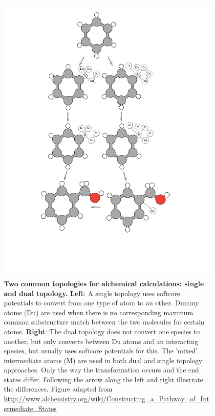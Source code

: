 \documentclass[9pt,bestpractices]{livecoms}
\begin{document}
\begin{figure}
    \includegraphics[width=0.95\columnwidth]{figures/fig3_topol/Figure.pdf}
    \caption{\textbf{Two common topologies for alchemical calculations: single and dual topology.} \textbf{Left}: A single topology uses softcore potentials to convert from one type of atom to an other. Dummy atoms (Du) are used when there is no corresponding maximum common substructure match between the two molecules for certain atoms. \textbf{Right}: The dual topology does not convert one species to another, but only converts between Du atoms and an interacting species, but usually uses softcore potentials for this. The 'mixed' intermediate atoms (M) are used in both dual and single topology approaches. Only the way the transformation occurs and the end states differ. Following the arrow along the left and right illustrate the differences. Figure adapted from \url{http://www.alchemistry.org/wiki/Constructing_a_Pathway_of_Intermediate_States}}
    \label{fig:fig_topology}
\end{figure} 
\end{document}

